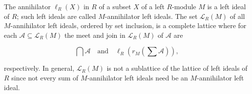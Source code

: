 The annihilator $\ell_R(X)$ in $R$ of a subset $X$ of a left $R$-module $M$ is a left ideal of $R$; such left ideals are called $M$-annihilator left ideals. The set $\mathcal{L}_R(M)$ of all $M$-annihilator left ideals, ordered by set inclusion, is a complete lattice where for each $\mathcal{A} \subseteq \mathcal{L}_R(M)$ the meet and join in $\mathcal{L}_R(M)$ of $\mathcal{A}$ are

$$\bigcap \mathcal{A} \quad \text{and} \quad \ell_R(r_M(\textstyle\sum \mathcal{A})),$$

respectively.  In general, $\mathcal{L}_R(M)$ is not a sublattice of the lattice of left ideals of $R$ since not every sum of $M$-annihilator left ideals need be an $M$-annihilator left ideal.
